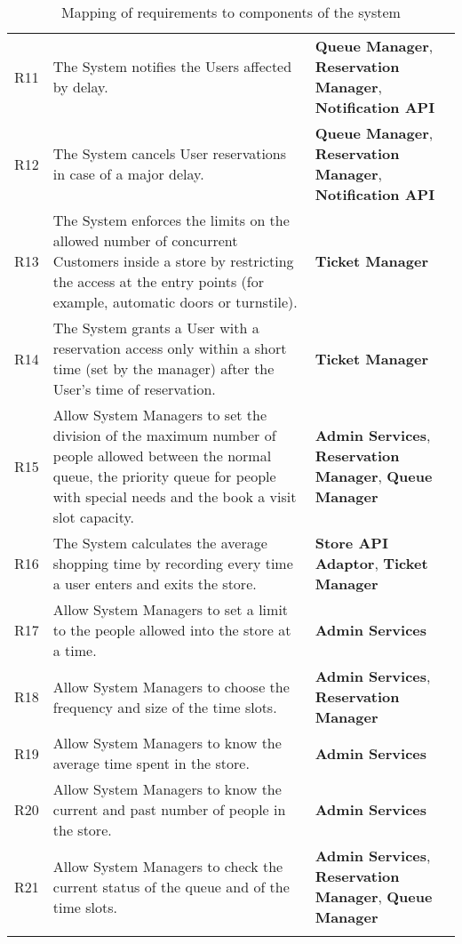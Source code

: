 \begin{longtable}{p{} p{} p{}}
    R11 & The System notifies the Users affected by delay. & \textbf{Queue Manager}, \textbf{Reservation Manager}, \textbf{Notification API}\\
    R12 & The System cancels User reservations in case of a major delay. & \textbf{Queue Manager}, \textbf{Reservation Manager}, \textbf{Notification API}\\
    R13 & The System enforces the limits on the allowed number of concurrent Customers inside a store by restricting the access at the entry points (for example, automatic doors or turnstile). & \textbf{Ticket Manager}\\
    R14 & The System grants a User with a reservation access only within a short time (set by the manager) after the User's time of reservation. & \textbf{Ticket Manager}\\
    R15 & Allow System Managers to set the division of the maximum number of people allowed between the normal queue, the priority queue for people with special needs and the book a visit slot capacity. & \textbf{Admin Services}, \textbf{Reservation Manager}, \textbf{Queue Manager}\\
    R16 & The System calculates the average shopping time by recording every time a user enters and exits the store. & \textbf{Store API Adaptor}, \textbf{Ticket Manager}\\
    
    R17 & Allow System Managers to set a limit to the people allowed into the store at a time. & \textbf{Admin Services}\\
    R18 & Allow System Managers to choose the frequency and size of the time slots. & \textbf{Admin Services}, \textbf{Reservation Manager}\\
    R19 & Allow System Managers to know the average time spent in the store. &  \textbf{Admin Services}\\
    R20 & Allow System Managers to know the current and past number of people in the store. & \textbf{Admin Services}\\
    R21 & Allow System Managers to check the current status of the queue and of the time slots. & \textbf{Admin Services}, \textbf{Reservation Manager}, \textbf{Queue Manager}\\

    \caption{Mapping of requirements to components of the system} %
    \label{tab:myfirstlongtable}
\end{longtable}
    
